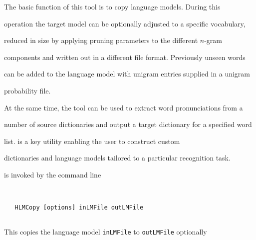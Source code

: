 %




%




%





\newpage














The basic function of this tool is to copy language models. During this


operation the target model can be optionally adjusted to a specific vocabulary,


reduced in size by applying pruning parameters to the different $n$-gram


components and written out in a different file format. Previously unseen words


can be added to the language model with unigram entries supplied in a unigram


probability file. 


At the same time, the tool can be used to extract word pronunciations from a


number of source dictionaries and output a target dictionary for a specified word


list.  is a key utility enabling the user to construct custom 


dictionaries and language models tailored to a particular recognition task.










 is invoked by the command line


\begin{verbatim}


   HLMCopy [options] inLMFile outLMFile


\end{verbatim}


This copies the language model {\tt inLMFile} to {\tt outLMFile} optionally


